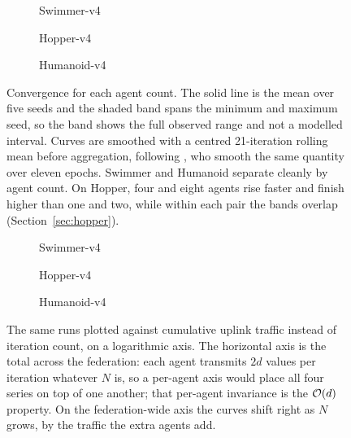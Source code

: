 \begin{figure}[t]
  \centering
  \begin{subfigure}[b]{0.49\textwidth}
    
    \caption{Swimmer-v4}
  \end{subfigure}
  \hfill
  \begin{subfigure}[b]{0.49\textwidth}
    
    \caption{Hopper-v4}
  \end{subfigure}

  \vspace{0.6em}
  \begin{subfigure}[b]{0.49\textwidth}
    
    \caption{Humanoid-v4}
  \end{subfigure}
  \caption{Convergence for each agent count. The solid line is the mean over five
  seeds and the shaded band spans the minimum and maximum seed, so the band
  shows the full observed range and not a modelled interval. Curves are
  smoothed with a centred 21-iteration rolling mean before aggregation,
  following \citet{spinningup}, who smooth the same quantity over eleven
  epochs. Swimmer and Humanoid separate cleanly by agent count. On Hopper, four
  and eight agents rise faster and finish higher than one and two, while within
  each pair the bands overlap (Section~\ref{sec:hopper}).}
  \label{fig:convergence}
\end{figure}

\begin{figure}[t]
  \centering
  \begin{subfigure}[b]{0.49\textwidth}
    
    \caption{Swimmer-v4}
  \end{subfigure}
  \hfill
  \begin{subfigure}[b]{0.49\textwidth}
    
    \caption{Hopper-v4}
  \end{subfigure}

  \vspace{0.6em}
  \begin{subfigure}[b]{0.49\textwidth}
    
    \caption{Humanoid-v4}
  \end{subfigure}
  \caption{The same runs plotted against cumulative uplink traffic instead of
  iteration count, on a logarithmic axis. The horizontal axis is the total
  across the federation: each agent transmits $2d$ values per iteration
  whatever $N$ is, so a per-agent axis would place all four series on top of
  one another; that per-agent invariance is the $\mathcal{O}(d)$ property. On the
  federation-wide axis the curves shift right as $N$ grows, by the traffic the
  extra agents add.}
  \label{fig:communication}
\end{figure}


